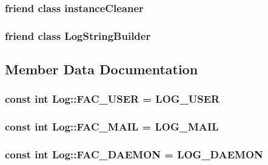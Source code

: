 \subsubsection{\setlength{\rightskip}{0pt plus 5cm}friend class {\bf instance\-Cleaner}\hspace{0.3cm}{\tt  [friend]}}\label{classLog_321cfbf9f58ebf3c9366bd6e0b5c18ce}


\subsubsection{\setlength{\rightskip}{0pt plus 5cm}friend class {\bf Log\-String\-Builder}\hspace{0.3cm}{\tt  [friend]}}\label{classLog_16ded253dbe65c503d1d853dcf5460d6}




\subsection{Member Data Documentation}
\subsubsection{\setlength{\rightskip}{0pt plus 5cm}const int {\bf Log::FAC\_\-USER} = LOG\_\-USER\hspace{0.3cm}{\tt  [static]}}\label{classLog_9418bab5d66822411ce1f85823d8425b}


\subsubsection{\setlength{\rightskip}{0pt plus 5cm}const int {\bf Log::FAC\_\-MAIL} = LOG\_\-MAIL\hspace{0.3cm}{\tt  [static]}}\label{classLog_5cf4b465d8ecff58bd62ac064663917b}


\subsubsection{\setlength{\rightskip}{0pt plus 5cm}const int {\bf Log::FAC\_\-DAEMON} = LOG\_\-DAEMON\hspace{0.3cm}{\tt  [static]}}\label{classLog_6395030c0b8fa7f36b6fe0f6b837055d}


